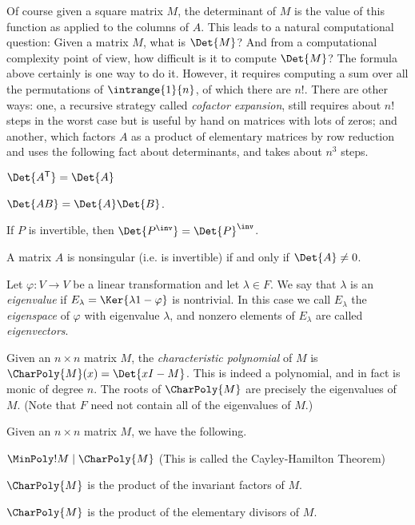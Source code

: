 \documentclass{memoir}
\begin{document}
Of course given a square matrix $M$, the determinant of $M$ is the value of this function as applied to the columns of $A$. This leads to a natural computational question: Given a matrix $M$, what is $\Det{M}$? And from a computational complexity point of view, how difficult is it to compute $\Det{M}$? The formula above certainly is one way to do it. However, it requires computing a sum over all the permutations of $\intrange{1}{n}$, of which there are $n!$. There are other ways: one, a recursive strategy called \emph{cofactor expansion}, still requires about $n!$ steps in the worst case but is useful by hand on matrices with lots of zeros; and another, which factors $A$ as a product of elementary matrices by row reduction and uses the following fact about determinants, and takes about $n^3$ steps.

\begin{prp} \mbox{}
\begin{enumerate*}
\item $\Det{A^\mathsf{T}} = \Det{A}$
\item $\Det{AB} = \Det{A} \Det{B}$.
\item If $P$ is invertible, then $\Det{P^\inv} = \Det{P}^\inv$.
\item A matrix $A$ is nonsingular (i.e. is invertible) if and only if $\Det{A} \neq 0$.
\end{enumerate*}
\end{prp}

\begin{dfn} \mbox{}
\begin{enumerate*}
\item Let $\varphi : V \rightarrow V$ be a linear transformation and let $\lambda \in F$. We say that $\lambda$ is an \emph{eigenvalue} if $E_\lambda = \Ker{\lambda 1 - \varphi}$ is nontrivial. In this case we call $E_\lambda$ the \emph{eigenspace} of $\varphi$ with eigenvalue $\lambda$, and nonzero elements of $E_\lambda$ are called \emph{eigenvectors}.
\item Given an $n \times n$ matrix $M$, the \emph{characteristic polynomial} of $M$ is $\CharPoly{M}(x) = \Det{xI - M}$. This is indeed a polynomial, and in fact is monic of degree $n$. The roots of $\CharPoly{M}$ are precisely the eigenvalues of $M$. (Note that $F$ need not contain all of the eigenvalues of $M$.)
\end{enumerate*}
\end{dfn}

\begin{prp}
Given an $n \times n$ matrix $M$, we have the following.
\begin{enumerate*}
\item $\MinPoly!{M} \mid \CharPoly{M}$ (This is called the Cayley-Hamilton Theorem)
\item $\CharPoly{M}$ is the product of the invariant factors of $M$.
\item $\CharPoly{M}$ is the product of the elementary divisors of $M$.
\end{enumerate*}
\end{prp}
\end{document}
